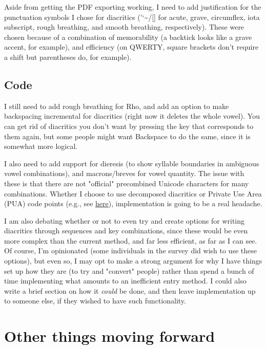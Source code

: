 \documentclass[11pt]{article}
\begin{document}
Aside from getting the PDF exporting working, I need to add justification for the punctuation symbols I chose for diacritics ('`\textasciitilde{}/[] for acute, grave, circumflex, iota subscript, rough breathing, and smooth breathing, respectively). These were chosen because of a combination of memorability (a backtick looks like a grave accent, for example), and efficiency (on QWERTY, square brackets don't require a shift but parentheses do, for example).

\subsection{Code}
\label{sec:org8877b2a}

I still need to add rough breathing for Rho, and add an option to make backspacing incremental for diacritics (right now it deletes the whole vowel). You can get rid of diacritics you don't want by pressing the key that corresponds to them again, but some people might want Backspace to do the same, since it is somewhat more logical.

I also need to add support for dieresis (to show syllable boundaries in ambiguous vowel combinations), and macrons/breves for vowel quantity. The issue with these is that there are not "official" precombined Unicode characters for many combinations. Whether I choose to use decomposed diacritics or Private Use Area (PUA) code points (e.g., see \href{https://apagreekkeys.org/technicalDetails.html\#PUA}{here}), implementation is going to be a real headache.

I am also debating whether or not to even try and create options for writing diacritics through sequences and key combinations, since these would be even more complex than the current method, and far less efficient, as far as I can see. Of course, I'm opinionated (some individuals in the survey did wish to use these options), but even so, I may opt to make a strong argument for why I have things set up how they are (to try and "convert" people) rather than spend a bunch of time implementing what amounts to an inefficient entry method. I could also write a brief section on how it \emph{could} be done, and then leave implementation up to someone else, if they wished to have such functionality.

\section{Other things moving forward}
\label{sec:orgaada083}
\end{document}
